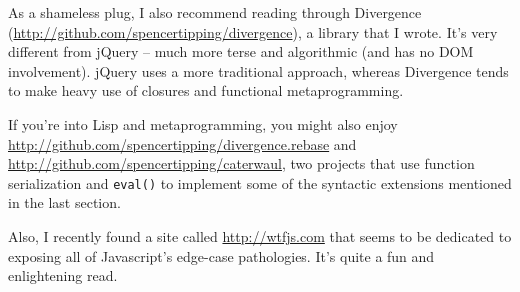 \documentclass{article}
\begin{document}
  As a shameless plug, I also recommend reading through Divergence (\url{http://github.com/spencertipping/divergence}), a library that I wrote. It's very different from jQuery -- much more
  terse and algorithmic (and has no DOM involvement). jQuery uses a more traditional approach, whereas Divergence tends to make heavy use of closures and functional metaprogramming.
  
  If you're into Lisp and metaprogramming, you might also enjoy \url{http://github.com/spencertipping/divergence.rebase} and \url{http://github.com/spencertipping/caterwaul}, two projects that
  use function serialization and \verb|eval()| to implement some of the syntactic extensions mentioned in the last section.

  Also, I recently found a site called \url{http://wtfjs.com} that seems to be dedicated to exposing all of Javascript's edge-case pathologies. It's quite a fun and enlightening read.
\end{document}
